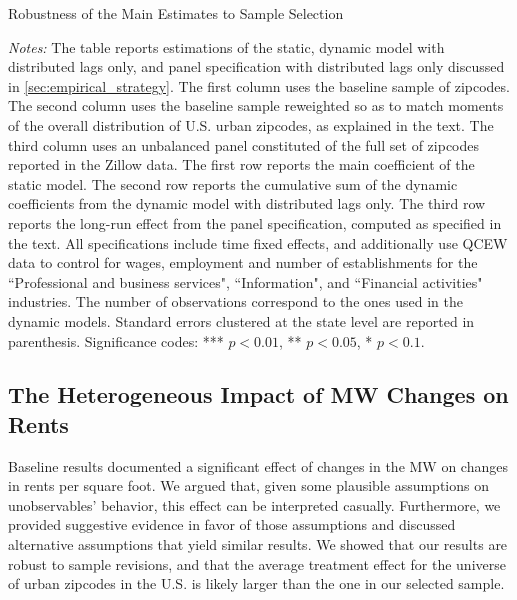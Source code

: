\begin{table}[h!]\centering
	\caption{Robustness of the Main Estimates to Sample Selection}  %
	\label{tab:wgt_unbal_comparison}
	
	\begin{minipage}{0.95\textwidth}\footnotesize
	\vspace{3mm}	
	\textit{Notes:} The table reports estimations of the static, dynamic model with distributed
	lags only, and panel specification with distributed lags only discussed in 
	\autoref{sec:empirical_strategy}. The first column uses the baseline sample of zipcodes. The 
	second column uses the baseline sample reweighted so as to match moments of the overall 
	distribution of U.S. urban zipcodes, as explained in the text. The third column uses an 
	unbalanced 	panel constituted of the full set of zipcodes reported in the Zillow data. The 
	first row reports the main coefficient of the static model. The second row reports the 
	cumulative sum of the dynamic coefficients from the dynamic model with distributed lags only. 
	The third row reports the long-run effect from the panel specification, computed as specified 
	in the text. All specifications include time fixed effects, and additionally use QCEW data to 
	control for wages, employment and number of establishments for the ``Professional and business 
	services", ``Information", and ``Financial activities" industries. The number of observations 
	correspond to the ones used in the dynamic models. 
	Standard errors clustered at the state level are reported in parenthesis. Significance codes: 
	*** $p < 0.01$, ** $p < 0.05$, * $p < 0.1$.
	\end{minipage}
\end{table}



\subsection{The Heterogeneous Impact of MW Changes on Rents}\label{sec:heter}

Baseline results documented a significant effect of changes in the MW
on changes in rents per square foot. We argued that, given some plausible assumptions on
unobservables' behavior, this effect can be interpreted casually. Furthermore, we provided
suggestive evidence in favor of those assumptions and discussed alternative assumptions 
that yield similar results. We showed that our results are robust to sample revisions, 
and that the average treatment effect for the 
universe of urban zipcodes in the U.S. is likely larger than the one in our selected sample. 


